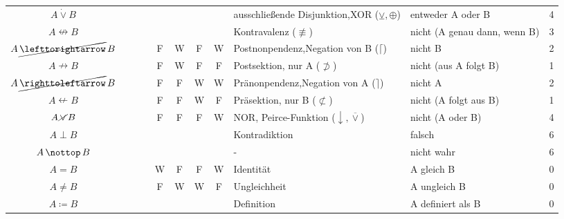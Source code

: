\documentclass[english,ngerman,parskip=half,headsepline,footsepline]{scrreprt}
\newcommand{\WWtrue}{W}
\newcommand{\WWfalse}{F}
\newcommand{\lleft}{\operatorname{\righttoleftarrow}}  %
\newcommand{\lright}{\operatorname{\lefttorightarrow}} %
\newcommand{\lnequiv}{\operatorname{\nleftrightarrow}} %
\newcommand{\lxor}{\operatorname{\dot{\lor}}}          %
\newcommand{\lnright}{\operatorname{\cancel{\lright}}} %
\newcommand{\lnimp}{\operatorname{\nrightarrow}}       %
\newcommand{\lnleft}{\operatorname{\cancel{\lleft}}}   %
\newcommand{\lnleftimp}{\operatorname{\nleftarrow}}    %
\newcommand{\lnor}{\operatorname{\cancel{\lor}}}       %
\newcommand{\lbfalse}{\operatorname{\bot}}             %
\newcommand{\lnbtrue}{\operatorname{\nottop}    }      %
\newcommand{\defeq}{\coloneqq}
\begin{document}
\begin{table}
\begin{threeparttable}
\begin{tabularx}{\linewidth}{c||c:cc:cccc|X:X|c|}
			$A\lxor B$&&&&\mrF&\mrW&\mrW&\mrF&ausschließende Disjunktion,\newline XOR ($\veebar, \oplus$)&entweder A oder B&4\\
			\gapline %
			$A\lnequiv B$&&&&&&&&Kontravalenz ($\not\equiv$)&{\small nicht (A genau dann, wenn B)} &3\\
			\tableline %
			$A\lnright B$&&&&\WWfalse&\WWtrue&\WWfalse&\WWtrue&Postnonpendenz,\newline Negation von B ($\lceil$)&nicht B&2\\
			\tableline %
			$A\lnimp B$&&&&\WWfalse&\WWtrue&\WWfalse&\WWfalse&Postsektion, nur A ($\not\supset$)&nicht (aus A folgt B) &1\\
			\tablegroup %
			$A\lnleft B$&&&&\WWfalse&\WWfalse&\WWtrue&\WWtrue&Pränonpendenz,\newline Negation von A ($\rceil$)&nicht A&2\\
			\tableline %
			$A\lnleftimp B$&&&&\WWfalse&\WWfalse&\WWtrue&\WWfalse&Präsektion, nur B ($\not\subset$)&nicht (A folgt aus B) &1\\
			\tableline %
			$A\lnor B$&&&&\WWfalse&\WWfalse&\WWfalse&\WWtrue&NOR, Peirce-Funktion ($\downarrow, \overline\vee$)&nicht (A oder B) &4\\
			\tableline %
			$A\lbfalse B$&&&&\mrF&\mrF&\mrF&\mrF&Kontradiktion&falsch&6\\
			\gapline %
			$A\lnbtrue B$&&&&&&&&-&nicht wahr&6\\
			\hline\hline %
			$A=B$&&&&\WWtrue&\WWfalse&\WWfalse&\WWtrue&Identität&A gleich B&0\\
			\tableline %
			$A\ne B$&&&&\WWfalse&\WWtrue&\WWtrue&\WWfalse&Ungleichheit&A ungleich B&0\\
			\tableline %
			$A\defeq B$&&&&&&&&Definition&A definiert als B&0\\
			\hline %

\end{tabularx}
\end{threeparttable}
\end{table}
\end{document}
